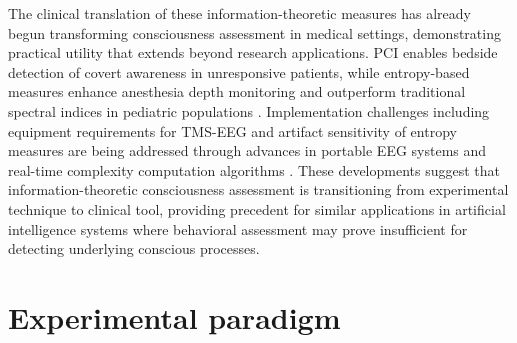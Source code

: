 \documentclass[11pt,a4paper]{article}
\begin{document}
The clinical translation of these information-theoretic measures has already begun transforming consciousness assessment in medical settings, demonstrating practical utility that extends beyond research applications. PCI enables bedside detection of covert awareness in unresponsive patients, while entropy-based measures enhance anesthesia depth monitoring and outperform traditional spectral indices in pediatric populations \citep{Casarotto2016, Zhang2001}. Implementation challenges including equipment requirements for TMS-EEG and artifact sensitivity of entropy measures are being addressed through advances in portable EEG systems and real-time complexity computation algorithms \citep{Sarasso2021}. These developments suggest that information-theoretic consciousness assessment is transitioning from experimental technique to clinical tool, providing precedent for similar applications in artificial intelligence systems where behavioral assessment may prove insufficient for detecting underlying conscious processes.

\section{Experimental paradigm}
\label{sec:experimental_paradigm}
\end{document}
